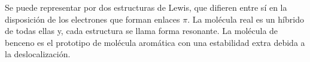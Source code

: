 \documentclass{tufte-handout}
\begin{document}
Se puede representar por dos estructuras de Lewis, que difieren 
entre sí en la disposición de los electrones que forman enlaces 
$\pi$. La molécula real es un híbrido de todas ellas y, cada
estructura se llama forma resonante. La molécula de benceno es 
el prototipo de molécula aromática con una estabilidad extra 
debida a la deslocalización.


%
%
%

\end{document}
